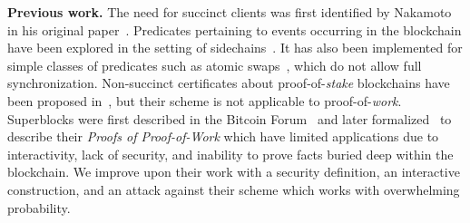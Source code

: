 \noindent
\textbf{Previous work.} The need for succinct clients was first identified by
Nakamoto in his original paper~\cite{bitcoin}. Predicates pertaining to events
occurring in the blockchain have been explored in the setting of
sidechains~\cite{sidechains}. It has
also been implemented for simple classes of predicates such as atomic
swaps~\cite{tiernolan,herlihy2018atomic}, which do not allow full
synchronization. Non-succinct certificates about proof-of-\emph{stake}
blockchains have been proposed in~\cite{pos-sidechains}, but their scheme is not
applicable to proof-of-\emph{work}. Superblocks were first described in the Bitcoin Forum~\cite{highway} and later formalized~\cite{popow} to describe their \emph{Proofs of Proof-of-Work} which have limited applications due to interactivity, lack of security, and inability to prove facts buried deep within the blockchain. We improve upon their work with a security definition, an interactive construction, and an attack against their scheme which works with overwhelming probability.
